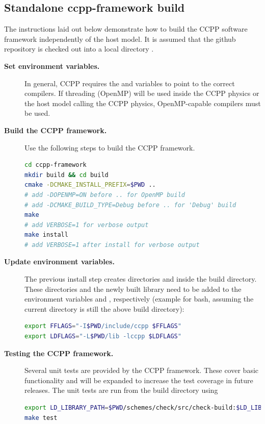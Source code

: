 \subsection{Standalone ccpp-framework build}\label{sec_ccpp_framework_standalone_build}
The instructions laid out below demonstrate how to build the CCPP software framework independently of the host model. It is assumed that the github repository is checked out into a local directory .
\begin{description}
\item[\textbf{Set environment variables.}] In general, CCPP requires the  and  variables to point to the correct compilers. If threading (OpenMP) will be used inside the CCPP physics or the host model calling the CCPP physics, OpenMP-capable compilers must be used.
\item[\textbf{Build the CCPP framework.}] Use the following steps to build the CCPP framework.
\begin{lstlisting}[language=bash]
cd ccpp-framework
mkdir build && cd build
cmake -DCMAKE_INSTALL_PREFIX=$PWD ..
# add -DOPENMP=ON before .. for OpenMP build
# add -DCMAKE_BUILD_TYPE=Debug before .. for 'Debug' build
make
# add VERBOSE=1 for verbose output
make install
# add VERBOSE=1 after install for verbose output
\end{lstlisting}
\item[\textbf{Update environment variables.}] The previous install step creates directories  and  inside the build directory. These directories and the newly built library  need to be added to the environment variables  and , respectively (example for bash, assuming the current directory is still the above build directory):
\begin{lstlisting}[language=bash]
export FFLAGS="-I$PWD/include/ccpp $FFLAGS"
export LDFLAGS="-L$PWD/lib -lccpp $LDFLAGS"
\end{lstlisting}
\item[\textbf{Testing the CCPP framework.}] Several unit tests are provided by the CCPP framework. These cover basic functionality and will be expanded to increase the test coverage in future releases. The unit tests are run from the build directory using
\begin{lstlisting}[language=bash]
export LD_LIBRARY_PATH=$PWD/schemes/check/src/check-build:$LD_LIBRARY_PATH
make test
\end{lstlisting}
\end{description}
